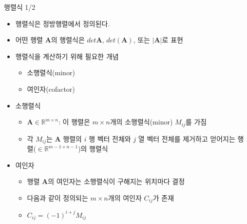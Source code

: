 \documentclass{beamer}
\begin{document}
\begin{frame}{행렬식 1/2}

\begin{itemize}
\item 행렬식은 정방행렬에서 정의된다.
\item 어떤 행렬 $\mathbf A$의 행렬식은 $det \mathbf A$, $det(\mathbf A)$, 또는 $|\mathbf A|$로 표현
\item 행렬식을 계산하기 위해 필요한 개념
	\begin{itemize}
	\item 소행렬식(minor)
	\item 여인자(cofactor)
	\end{itemize}
\item 소행렬식
	\begin{itemize}
	\item $\mathbf A \in \mathbb R^{m \times n}$: 이 행렬은 $m \times n$개의 소행렬식(minor) $M_{ij}$를 가짐
	\item 각 $M_{ij}$는 $\mathbf A$ 행렬의 $i$ 행 벡터 전체와 $j$ 열 벡터 전체를 제거하고 얻어지는 행렬($\in \mathbb R^{m-1 \times n-1}$)의 
행렬식
	\end{itemize}
\item 여인자
	\begin{itemize}
	\item 행렬 $\mathbf A$의 여인자는 소행렬식이 구해지는 위치마다 결정
	\item 다음과 같이 정의되는 $m \times n$개의 여인자 $C_{ij}$가 존재
	\item $C_{ij} = (-1)^{i+j} M_{ij}$
	\end{itemize}
\end{itemize}

\end{frame}
\end{document}
